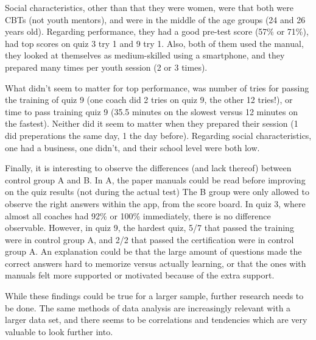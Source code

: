 Social characteristics, other than that they were women, were that both were CBTs (not youth mentors), and were in the middle of the age groups (24 and 26 years old). Regarding performance, they had a good pre-test score (57\% or 71\%), had top scores on quiz 3 try 1 and 9 try 1. Also, both of them used the manual, they looked at themselves as medium-skilled using a smartphone, and they prepared many times per youth session (2 or 3 times).

What didn't seem to matter for top performance, was number of tries for passing the training of quiz 9 (one coach did 2 tries on quiz 9, the other 12 tries!), or time to pass training quiz 9 (35.5 minutes on the slowest versus 12 minutes on the fastest). Neither did it seem to matter when they prepared their session (1 did preperations the same day, 1 the day before). Regarding social characteristics, one had a business, one didn't, and their school level were both low.

Finally, it is interesting to observe the differences (and lack thereof) between control group A and B. In A, the paper manuals could be read before improving on the quiz results (not during the actual test) The B group were only allowed to observe the right answers within the app, from the score board. In quiz 3, where almost all coaches had 92\% or 100\% immediately, there is no difference observable. However, in quiz 9, the hardest quiz, 5/7 that passed the training were in control group A, and 2/2 that passed the certification were in control group A. An explanation could be that the large amount of questions made the correct answers hard to memorize versus actually learning, or that the ones with manuals felt more supported or motivated because of the extra support.

While these findings could be true for a larger sample, further research needs to be done. The same methods of data analysis are increasingly relevant with a larger data set, and there seems to be correlations and tendencies which are very valuable to look further into.
